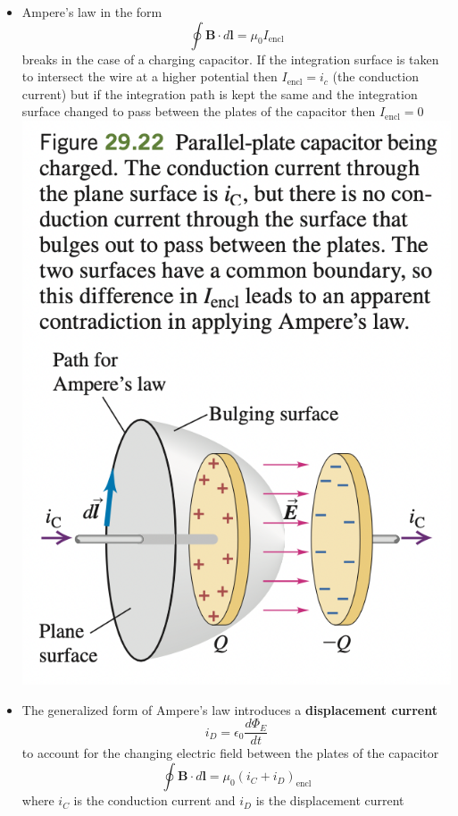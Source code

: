 \documentclass{article}
\begin{document}
\begin{itemize}
  \item Ampere's law in the form \[\oint \mathbf{B} \cdot d \mathbf{l} = \mu_0 I_\text{encl}\] breaks in the case of a charging capacitor. If the integration surface is taken to intersect the wire at a higher potential then $I_\text{encl} = i_c$ (the conduction current) but if the integration path is kept the same and the integration surface changed to pass between the plates of the capacitor then $I_\text{encl} = 0$ \\ \includegraphics[scale=0.75]{amperes-law-capacitor}

  \item The generalized form of Ampere's law introduces a \textbf{displacement current} \[i_D = \epsilon_0 \frac{d \Phi_E}{dt}\] to account for the changing electric field between the plates of the capacitor \[\oint \mathbf{B} \cdot d \mathbf{l} = \mu_0 (i_C + i_D)_\text{encl}\] where $i_C$ is the conduction current and $i_D$ is the displacement current


\end{itemize}
\end{document}
